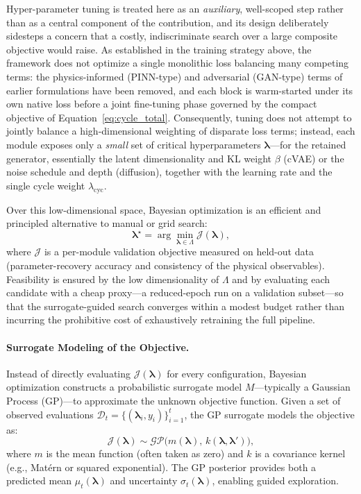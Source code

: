 \documentclass[letterpaper, 12, one column]{article}
\begin{document}
Hyper-parameter tuning is treated here as an \emph{auxiliary}, well-scoped step rather than as a central component of the contribution, and its design deliberately sidesteps a concern that a costly, indiscriminate search over a large composite objective would raise. As established in the training strategy above, the framework does not optimize a single monolithic loss balancing many competing terms: the physics-informed (PINN-type) and adversarial (GAN-type) terms of earlier formulations have been removed, and each block is warm-started under its own native loss before a joint fine-tuning phase governed by the compact objective of Equation~\ref{eq:cycle_total}. Consequently, tuning does not attempt to jointly balance a high-dimensional weighting of disparate loss terms; instead, each module exposes only a \emph{small} set of critical hyperparameters $\boldsymbol{\lambda}$---for the retained generator, essentially the latent dimensionality and KL weight $\beta$ (cVAE) or the noise schedule and depth (diffusion), together with the learning rate and the single cycle weight $\lambda_{\mathrm{cyc}}$.

Over this low-dimensional space, Bayesian optimization is an efficient and principled alternative to manual or grid search:
\begin{equation}
\label{eq:hyperparameter_objective}
\boldsymbol{\lambda}^{\star} =
\arg\min_{\boldsymbol{\lambda} \in \Lambda}
\mathcal{J}(\boldsymbol{\lambda}),
\end{equation}
where $\mathcal{J}$ is a per-module validation objective measured on held-out data (parameter-recovery accuracy and consistency of the physical observables). Feasibility is ensured by the low dimensionality of $\Lambda$ and by evaluating each candidate with a cheap proxy---a reduced-epoch run on a validation subset---so that the surrogate-guided search converges within a modest budget rather than incurring the prohibitive cost of exhaustively retraining the full pipeline.

\paragraph{Surrogate Modeling of the Objective.}
Instead of directly evaluating $\mathcal{J}(\boldsymbol{\lambda})$ for every configuration, Bayesian optimization constructs a probabilistic surrogate model $M$—typically a Gaussian Process (GP)—to approximate the unknown objective function.  
Given a set of observed evaluations 
$\mathcal{D}_{t} = \{ (\boldsymbol{\lambda}_{i}, y_{i}) \}_{i=1}^{t}$,
the GP surrogate models the objective as:
\begin{equation}
\label{eq:gaussian_process_surrogate}
\mathcal{J}(\boldsymbol{\lambda}) \sim 
\mathcal{GP}\big( m(\boldsymbol{\lambda}),\, 
k(\boldsymbol{\lambda}, \boldsymbol{\lambda}') \big),
\end{equation}
where $m$ is the mean function (often taken as zero) and $k$ is a covariance kernel (e.g., Matérn or squared exponential).  
The GP posterior provides both a predicted mean $\mu_{t}(\boldsymbol{\lambda})$ and uncertainty $\sigma_{t}(\boldsymbol{\lambda})$, enabling guided exploration.
\end{document}
